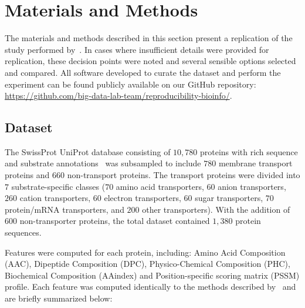 \section{Materials and Methods}
\label{sec:materials}
The materials and methods described in this section present a replication of the study performed
by~\citet{mishra2014prediction}. In cases where insufficient details were provided for replication,
these decision points were noted and several sensible options selected and compared. All software 
developed to curate the dataset and perform the experiment can be found publicly available on
our GitHub repository: \url{https://github.com/big-data-lab-team/reproducibility-bioinfo/}.

\subsection{Dataset}
\label{sec:dataset}

The SwissProt UniProt database consisting of $10,780$ proteins with rich sequence and substrate
annotations~\citep{boeckmann2003swiss} was subsampled to include $780$ membrane transport proteins and $660$
non-transport proteins. The transport proteins were divided into $7$ substrate-specific classes ($70$ amino acid
transporters, $60$ anion transporters, $260$ cation transporters, $60$ electron transporters, $60$ sugar
transporters, $70$ protein/mRNA transporters, and $200$ other transporters). With the addition of 600 non-transporter
proteins, the total dataset contained $1,380$ protein sequences. 

Features were computed for each protein, including: Amino Acid Composition (AAC), Dipeptide Composition (DPC),
Physico-Chemical Composition (PHC), Biochemical Composition (AAindex) and Position-specific scoring matrix (PSSM)
profile. Each feature was computed identically to the methods described by~\citet{mishra2014prediction} and are briefly
summarized below:


